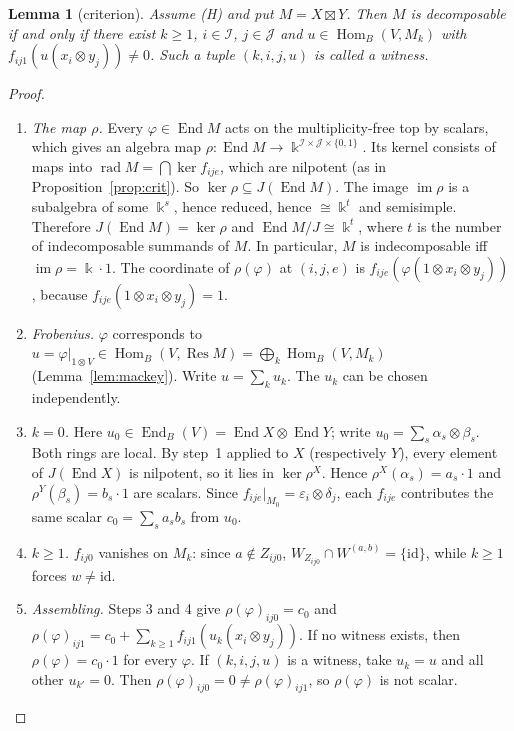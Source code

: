 \documentclass[11pt]{amsart}
\newcommand{\Hom}{\operatorname{Hom}}
\newcommand{\End}{\operatorname{End}}
\newcommand{\Res}{\operatorname{Res}}
\newcommand{\rad}{\operatorname{rad}}
\newcommand{\kk}{\Bbbk}
\newcommand{\sq}{\boxtimes}
\newcommand{\Ib}{\mathcal I}
\newcommand{\Jb}{\mathcal J}
\theoremstyle{plain}
\newtheorem{lemmaII}{Lemma}
\theoremstyle{definition}
\begin{document}
\begin{lemmaII}[criterion]\label{II:crit}
Assume (H) and put $M=X\sq Y$. Then $M$ is decomposable if and only if there exist $k\ge1$, $i\in\Ib$, $j\in\Jb$ and $u\in\Hom_B(V,M_k)$ with $f_{ij1}(u(x_i\otimes y_j))\ne0$. Such a tuple $(k,i,j,u)$ is called a \emph{witness}.
\end{lemmaII}

\begin{proof}
\begin{enumerate}[label=\textup{\arabic*.},leftmargin=1.5em,itemsep=2pt]
\item \emph{The map $\rho$.} Every $\varphi\in\End M$ acts on the multiplicity-free top by scalars, which gives an algebra map $\rho:\End M\to\kk^{\Ib\times\Jb\times\{0,1\}}$. Its kernel consists of maps into $\rad M=\bigcap\ker f_{ije}$, which are nilpotent (as in Proposition~\ref{prop:crit}). So $\ker\rho\subseteq J(\End M)$. The image $\operatorname{im}\rho$ is a subalgebra of some $\kk^s$, hence reduced, hence $\cong\kk^t$ and semisimple. Therefore $J(\End M)=\ker\rho$ and $\End M/J\cong\kk^t$, where $t$ is the number of indecomposable summands of $M$. In particular, $M$ is indecomposable iff $\operatorname{im}\rho=\kk\cdot1$. The coordinate of $\rho(\varphi)$ at $(i,j,e)$ is $f_{ije}(\varphi(1\otimes x_i\otimes y_j))$, because $f_{ije}(1\otimes x_i\otimes y_j)=1$.
\item \emph{Frobenius.} $\varphi$ corresponds to $u=\varphi|_{1\otimes V}\in\Hom_B(V,\Res M)=\bigoplus_k\Hom_B(V,M_k)$ (Lemma~\ref{lem:mackey}). Write $u=\sum_ku_k$. The $u_k$ can be chosen independently.
\item \emph{$k=0$.} Here $u_0\in\End_B(V)=\End X\otimes\End Y$; write $u_0=\sum_s\alpha_s\otimes\beta_s$. Both rings are local. By step~1 applied to $X$ (respectively $Y$), every element of $J(\End X)$ is nilpotent, so it lies in $\ker\rho^X$. Hence $\rho^X(\alpha_s)=a_s\cdot1$ and $\rho^Y(\beta_s)=b_s\cdot1$ are scalars. Since $f_{ije}|_{M_0}=\varepsilon_i\otimes\delta_j$, each $f_{ije}$ contributes the same scalar $c_0=\sum_sa_sb_s$ from $u_0$.
\item \emph{$k\ge1$.} $f_{ij0}$ vanishes on $M_k$: since $a\notin Z_{ij0}$, $W_{Z_{ij0}}\cap W^{(a,b)}=\{\mathrm{id}\}$, while $k\ge1$ forces $w\ne\mathrm{id}$.
\item \emph{Assembling.} Steps 3 and 4 give $\rho(\varphi)_{ij0}=c_0$ and $\rho(\varphi)_{ij1}=c_0+\sum_{k\ge1}f_{ij1}(u_k(x_i\otimes y_j))$. If no witness exists, then $\rho(\varphi)=c_0\cdot1$ for every $\varphi$. If $(k,i,j,u)$ is a witness, take $u_k=u$ and all other $u_{k'}=0$. Then $\rho(\varphi)_{ij0}=0\ne\rho(\varphi)_{ij1}$, so $\rho(\varphi)$ is not scalar.\qedhere
\end{enumerate}
\end{proof}
\end{document}
